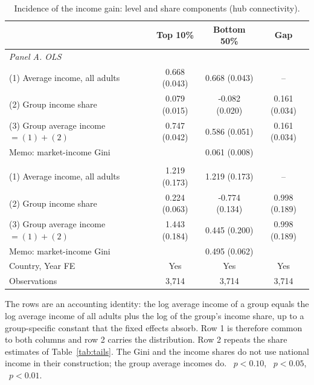\begin{table}[H]\centering\caption{Incidence of the income gain: level and share components (hub connectivity).}\label{tab:growth_decomp}
\begin{threeparttable}\small\begin{tabular}{lccc}
\toprule
 & Top 10\% & Bottom 50\% & Gap \\
\midrule
\multicolumn{4}{l}{\emph{Panel A. OLS}}\\
(1) Average income, all adults & 0.668\sym{***} (0.043) & 0.668\sym{***} (0.043) & -- \\
(2) Group income share & 0.079\sym{***} (0.015) & -0.082\sym{***} (0.020) & 0.161\sym{***} (0.034) \\
(3) Group average income $=(1)+(2)$ & 0.747\sym{***} (0.042) & 0.586\sym{***} (0.051) & 0.161\sym{***} (0.034) \\
Memo: market-income Gini & \multicolumn{3}{c}{0.061\sym{***} (0.008)} \\
\addlinespace
\multicolumn{4}{l}{\emph{Panel B. 2SLS, Feyrer instrument}}\\
(1) Average income, all adults & 1.219\sym{***} (0.173) & 1.219\sym{***} (0.173) & -- \\
(2) Group income share & 0.224\sym{***} (0.063) & -0.774\sym{***} (0.134) & 0.998\sym{***} (0.189) \\
(3) Group average income $=(1)+(2)$ & 1.443\sym{***} (0.184) & 0.445\sym{**} (0.200) & 0.998\sym{***} (0.189) \\
Memo: market-income Gini & \multicolumn{3}{c}{0.495\sym{***} (0.062)} \\
\addlinespace
\midrule
Country, Year FE & Yes & Yes & Yes \\
Observations & 3,714 & 3,714 & 3,714 \\
\bottomrule
\end{tabular}
\begin{tablenotes}\footnotesize\item The rows are an accounting identity: the log average income of a group equals the log average income of all adults plus the log of the group's income share, up to a group-specific constant that the fixed effects absorb. Row 1 is therefore common to both columns and row 2 carries the distribution. Row 2 repeats the share estimates of Table~\ref{tab:tails}. The Gini and the income shares do not use national income in their construction; the group average incomes do. \sym{*}~$p<0.10$, \sym{**}~$p<0.05$, \sym{***}~$p<0.01$.\end{tablenotes}\end{threeparttable}\end{table}

